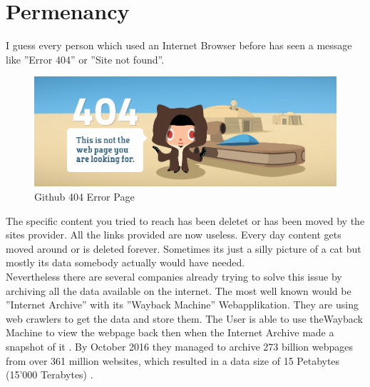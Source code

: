 \documentclass[a4paper,11pt, oneside]{report}
\theoremstyle{definition}
\begin{document}
\newpage
\section{Permenancy}
I guess every person which used an Internet Browser before has seen a message like ''Error 404'' or ''Site not found''.
\begin{figure}[H]
\centering
\includegraphics[width=\textwidth]{img/github-404.png}
\caption[Github 404 Error Page]{Github 404 Error Page}
\end{figure}
\noindent
The specific content you tried to reach has been deletet or has been moved by the sites provider. All the links provided are now useless. Every day content gets moved around or is deleted forever. Sometimes its just a silly picture of a cat but mostly its data somebody actually would have needed.\\[0.3cm]
Nevertheless there are several companies already trying to solve this issue by archiving all the data available on the internet. The most well known would be ''Internet Archive'' with its ''Wayback Machine'' Webapplikation. They are using web crawlers to get the data and store them. The User is able to use theWayback Machine to view the webpage back then when the Internet Archive made a snapshot of it \cite{InternetArchive}. By October 2016 they managed to archive 273 billion webpages from over 361 million websites, which resulted in a data size of 15 Petabytes (15'000 Terabytes) \cite{InternetArchiveCount}.

\newpage
\end{document}
